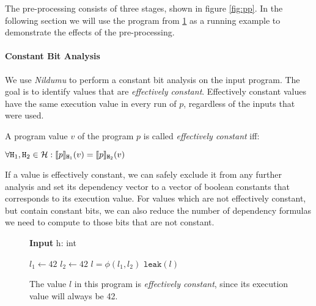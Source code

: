 The pre-processing consists of three stages, shown in figure \ref{fig:pp}. In the following section we will use the program from \ref{fig:ec} as a running example to demonstrate the effects of the pre-processing.

\paragraph{Constant Bit Analysis}
We use \emph{Nildumu} \cite{bechberger18} to perform a constant bit analysis on the input program. The goal is to identify values that are \emph{effectively constant}. Effectively constant values have the same execution value in every run of $p$, regardless of the inputs that were used.

\begin{definition}
    A program value $v$ of the program $p$ is called \emph{effectively constant} iff:
    \begin{center}
        $\forall \mathtt{H}_1, \mathtt{H}_2 \in \mathcal{H}: \llbracket p \rrbracket_{\mathtt{H}_1} (v) = \llbracket p \rrbracket_{\mathtt{H}_2}(v)$
    \end{center}
\end{definition}

If a value is effectively constant, we can safely exclude it from any further analysis and set its dependency vector to a vector of boolean constants that corresponds to its execution value. For values which are not effectively constant, but contain constant bits, we can also reduce the number of dependency formulas we need to compute to those bits that are not constant.


\begin{figure}
    \centering
    \begin{minipage}{.7\linewidth}
        \begin{algorithm}[H]
            \hspace*{\algorithmicindent} \textbf{Input} h: int \\
            \hspace{1em}
            \begin{algorithmic}[1]
                \State $l_1 \leftarrow 42$
                \Else
                \State $l_2 \leftarrow 42$
                \EndIf
                \State $l = \phi(l_1, l_2)$
                \State $\mathtt{leak}(l)$
            \end{algorithmic}
        \end{algorithm}
    \end{minipage}
    \caption{The value $l$ in this program is \emph{effectively constant}, since its execution value will always be 42.}
    \label{fig:ec}
\end{figure}

